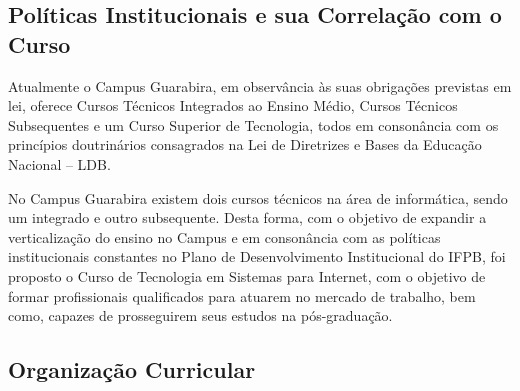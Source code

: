 \subsection{Pol\'iticas Institucionais e sua Correla\c{c}\~ao com o Curso}

        Atualmente o Campus Guarabira, em observância às suas obrigações previstas em lei, oferece Cursos Técnicos Integrados ao Ensino Médio, Cursos Técnicos Subsequentes e um Curso Superior de Tecnologia, todos em consonância com os princípios doutrinários consagrados na Lei de Diretrizes e Bases da Educação Nacional – LDB. 

        No Campus Guarabira existem dois cursos técnicos na \'area de inform\'atica, sendo um integrado e outro subsequente. Desta forma, com o objetivo de expandir a verticalização do ensino no Campus e em consonância com as políticas institucionais constantes no Plano de Desenvolvimento Institucional do IFPB, foi proposto o Curso de Tecnologia em Sistemas para Internet, com o objetivo de formar profissionais qualificados para atuarem no mercado de trabalho, bem como, capazes de prosseguirem seus estudos na pós-graduação. 

\newpage
\subsection{Organiza\c{c}\~ao Curricular}

